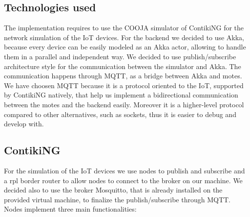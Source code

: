 \documentclass[10pt]{article}
\begin{document}
	\subsection{Technologies used}
	The implementation requires to use the COOJA simulator of ContikiNG for the network simulation of the IoT devices. For the backend we decided to use Akka, because every device can be easily modeled as an Akka actor, allowing to handle them in a parallel and independent way. We decided to use publish/subscribe architecture style for the communication between the simulator and Akka. The communication happens through MQTT, as a bridge between Akka and motes. We have choosen MQTT because it is a protocol oriented to the IoT, supported by ContikiNG natively, that help us implement a bidirectional communication between the motes and the backend easily. Moreover it is a higher-level protocol compared to other alternatives, such as sockets, thus it is easier to debug and develop with.  
	
	\subsection{ContikiNG}
	For the simulation of the IoT devices we use nodes to publish and subscribe and a rpl border router to allow nodes to connect to the broker on our machine. We decided also to use the broker Mosquitto, that is already installed on the provided virtual machine, to finalize the publish/subscribe through MQTT.
	Nodes implement three main functionalities:
	
\end{document}
